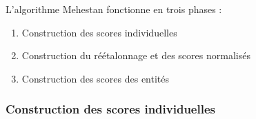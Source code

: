 L'algorithme Mehestan fonctionne en trois phases :

\begin{enumerate}
    \item Construction des scores individuelles
    \item Construction du réétalonnage et des scores normalisés
    \item Construction des scores des entités
\end{enumerate}
\subsubsection{Construction des scores individuelles}

\pagebreak

